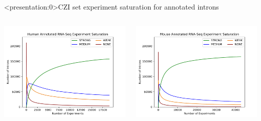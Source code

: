 \documentclass[10pt,
               hyperref={bookmarks=false,
                         bookmarksopen=false,
                         colorlinks=true,
                         linkcolor=blue,
                         urlcolor=blue},
               xcolor={svgnames,table}]{beamer}
\begin{document}
\begin{frame}<presentation:0>{CZI set experiment saturation for annotated introns}
  \begin{columns}
    \begin{column}{0.5\textwidth}
      \includegraphics[scale=0.37]{images/hs_saturation_annot.pdf}
    \end{column}
    \begin{column}{0.5\textwidth}
      \includegraphics[scale=0.37]{images/mm_saturation_annot.pdf}
    \end{column}
  \end{columns}
\end{frame}
\end{document}
